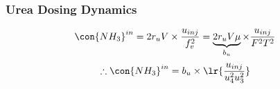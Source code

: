\subsubsection{Urea Dosing Dynamics}
\begin{align*}
        \con{NH_3}^{in} &= 2r_u V \times \frac{u_{inj}}{f_v^2}
                                         = \underbrace{2r_u V \mu }_{b_u} \times \frac{u_{inj}}{F^2 T^2}
\end{align*}
\begin{align}
        \therefore \con{NH_3}^{in} &= b_u \times \lr{\frac{u_{inj}}{u_4^2 u_3^2}}
\end{align}
